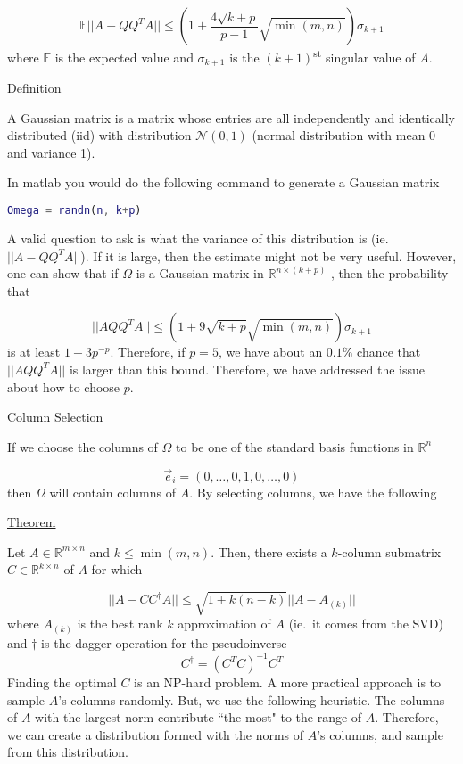 \begin{equation*}
    \mathbb{E} || A - QQ^TA || \leq \left( 1 + \frac{4\sqrt{k+p}}{p-1}
    \sqrt{\min (m, n)}
    \right) \sigma_{k+1}
\end{equation*}
where $\mathbb{E}$ is the expected value and $\sigma_{k+1}$ is the $(k+1)$\textsuperscript{st} singular value of $A$.


\underline{Definition}

A Gaussian matrix is a matrix whose entries are all independently and identically distributed (iid) with distribution $\mathcal{N}(0, 1)$ (normal distribution with mean 0 and variance 1).

{\color{red}
In matlab you would do the following command to generate a Gaussian matrix

\begin{lstlisting}[language=Matlab]
Omega = randn(n, k+p)
\end{lstlisting}
}

A valid question to ask is what the variance of this distribution is (ie.\ $||A-QQ^TA||$). If it is large, then the estimate might not be very useful. However, one can show that if $\Omega$ is a Gaussian matrix in $\mathbb{R}^{n\times (k+p)}$
, then the probability that

\begin{equation*}
    ||AQQ^TA||\leq \left(1 + 9\sqrt{k+p}\sqrt{\min (m, n)}\right)\sigma_{k+1}
\end{equation*}
is at least $1-3p^{-p}$. Therefore, if $p=5$, we have about an $0.1\%$ chance that $||AQQ^TA||$ is larger than this bound. Therefore, we have addressed the issue about how to choose $p$.

\underline{Column Selection}

If we choose the columns of $\Omega$ to be one of the standard basis functions in $\mathbb{R}^n$

\begin{equation*}
    \vec{e}_i = (0, \ldots, 0, 1, 0, \ldots, 0)
\end{equation*}
then $\Omega$ will contain columns of $A$. By selecting columns, we have the following

\underline{Theorem}

Let $A\in\mathbb{R}^{m\times n}$ and $k\leq \min (m,n)$. Then, there exists a $k$-column submatrix $C\in\mathbb{R}^{k\times n}$ of $A$ for which

\begin{equation*}
    || A-CC^\dagger A || \leq \sqrt{1 + k(n-k)} || A-A_{(k)}||
\end{equation*}
where $A_{(k)}$ is the best rank $k$ approximation of $A$ (ie.\ it comes from the SVD) and $\dagger$ is the dagger operation for the pseudoinverse
\begin{equation*}
    C^\dagger = (C^TC)^{-1}C^T
\end{equation*}
Finding the optimal $C$ is an NP-hard problem. A more practical approach is to sample $A$'s columns randomly. But, we use the following heuristic. The columns of $A$ with the largest norm contribute ``the most" to the range of $A$. Therefore, we can create a distribution formed with the norms of $A$'s columns, and sample from this distribution.

